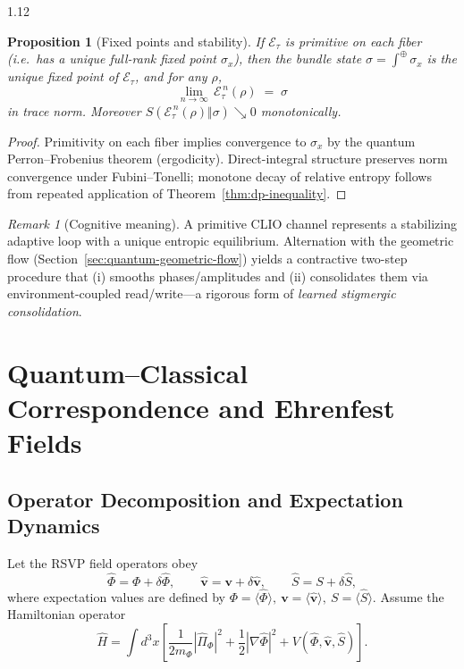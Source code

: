 \documentclass[12pt,a4paper]{article}
\numberwithin{equation}{section}
\newtheorem{proposition}{Proposition}[section]
\theoremstyle{remark}
\newtheorem{remark}{Remark}[section]
\theoremstyle{definition}
\begin{document}
\begin{spacing}{1.12}
\begin{proposition}[Fixed points and stability]
\label{prop:fixed-points}
If $\mathcal{E}_\tau$ is primitive on each fiber (i.e.\ has a unique full-rank fixed point $\sigma_x$), then the bundle state $\sigma=\int^\oplus\sigma_x$ is the unique fixed point of $\mathcal{E}_\tau$, and for any $\rho$,
\begin{equation}
\lim_{n\to\infty}\,\mathcal{E}_\tau^{\,n}(\rho)\;=\;\sigma
\end{equation}
in trace norm. Moreover $S(\mathcal{E}_\tau^{\,n}(\rho)\Vert \sigma)\searrow 0$ monotonically.
\end{proposition}

\begin{proof}
Primitivity on each fiber implies convergence to $\sigma_x$ by the quantum Perron–Frobenius theorem (ergodicity).
Direct-integral structure preserves norm convergence under Fubini–Tonelli; monotone decay of relative entropy follows from repeated application of Theorem~\ref{thm:dp-inequality}.
\end{proof}

\begin{remark}[Cognitive meaning]
A primitive CLIO channel represents a stabilizing adaptive loop with a unique entropic equilibrium. Alternation with the geometric flow (Section~\ref{sec:quantum-geometric-flow}) yields a contractive two-step procedure that (i) smooths phases/amplitudes and (ii) consolidates them via environment-coupled read/write---a rigorous form of \emph{learned stigmergic consolidation}.
\end{remark}


\section{Quantum--Classical Correspondence and Ehrenfest Fields}\label{sec:ehrenfest}

\subsection{Operator Decomposition and Expectation Dynamics}

Let the RSVP field operators obey
\[
\hat{\Phi} = \Phi + \delta \hat{\Phi}, \qquad
\hat{\mathbf{v}} = \mathbf{v} + \delta \hat{\mathbf{v}}, \qquad
\hat{S} = S + \delta \hat{S},
\]
where expectation values are defined by
\(\Phi = \langle \hat{\Phi} \rangle,~ \mathbf{v} = \langle \hat{\mathbf{v}} \rangle,~ S = \langle \hat{S} \rangle.\)
Assume the Hamiltonian operator
\[
\hat{H} = \int d^3x \left[
\frac{1}{2m_\Phi}|\hat{\Pi}_\Phi|^2 +
\frac{1}{2}|\nabla \hat{\Phi}|^2 +
V(\hat{\Phi}, \hat{\mathbf{v}}, \hat{S})
\right].
\]


\end{spacing}
\end{document}
